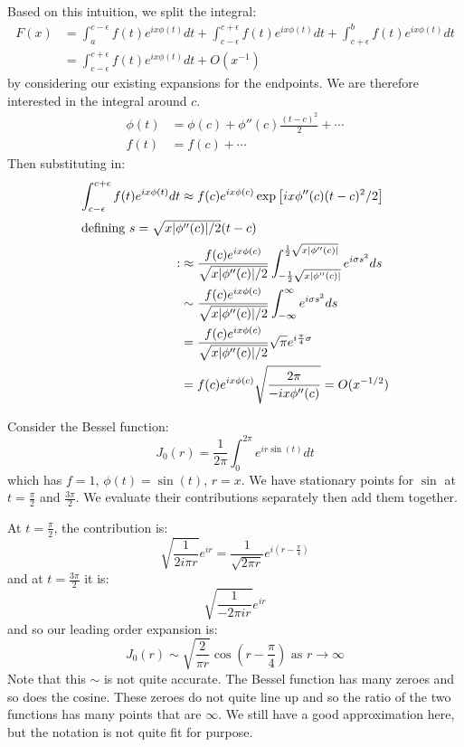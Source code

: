 \documentclass[../Main.tex]{subfiles}
\begin{document}
Based on this intuition, we split the integral:
\begin{align*}
    F(x) &= \int_{a}^{c-\epsilon} f(t)e^{ix\phi(t)} dt + \int_{c-\epsilon}^{c+\epsilon} f(t)e^{ix\phi(t)} dt + \int_{c+\epsilon}^{b} f(t)e^{ix\phi(t)} dt \\
    &= \int_{c-\epsilon}^{c+\epsilon} f(t)e^{ix\phi(t)} dt + O(x^{-1})
\end{align*}
by considering our existing expansions for the endpoints. We are therefore interested in the integral around $c$.
\begin{align*}
    \phi(t) &= \phi(c) + \phi''(c) \frac{(t-c)^2}{2} + \cdots \\
    f(t) &= f(c) + \cdots
\end{align*}
Then substituting in:
\begin{align*}
    \int_{c-\epsilon}^{c+\epsilon} f(t)e^{ix\phi(t)} dt &\approx f(c) e^{ix\phi(c)} \exp\left[ix\phi''(c) (t-c)^2 / 2\right] \\
    \intertext{defining $s = \sqrt{x|\phi''(c)| / 2}(t-c)$}:
    &\approx \frac{f(c)e^{ix\phi(c)}}{\sqrt{x|\phi''(c)| / 2}} \int_{-\frac12 \sqrt{x|\phi''(c)|}}^{\frac12 \sqrt{x|\phi''(c)|}} e^{i\sigma s^2} ds \\
    &\sim \frac{f(c)e^{ix\phi(c)}}{\sqrt{x|\phi''(c)| / 2}} \int_{-\infty}^{\infty} e^{i\sigma s^2} ds \\
    &= \frac{f(c)e^{ix\phi(c)}}{\sqrt{x|\phi''(c)| / 2}} \sqrt{\pi} e^{i \frac{\pi}{4} \sigma} \\
    &= f(c) e^{ix\phi(c)} \sqrt{\frac{2\pi}{-ix\phi''(c)}} = O(x^{-1/2})
\end{align*}
\begin{example}
    \label{exBesselStatPhase}
    Consider the Bessel function:
    \begin{equation*}
        J_0(r) = \frac{1}{2\pi} \int_{0}^{2\pi} e^{ir\sin(t)} dt 
    \end{equation*}
    which has $f = 1$, $\phi(t) = \sin(t)$, $r = x$. We have stationary points for $\sin$ at $t = \frac\pi2$ and $\frac{3\pi}2$. We evaluate their contributions separately then add them together.

    At $t = \frac\pi2$, the contribution is:
    \begin{equation*}
        \sqrt{\frac{1}{2i\pi r}} e^{ir} = \frac{1}{\sqrt{2\pi r}}e^{i(r - \frac\pi 4)}
    \end{equation*}
    and at $t = \frac{3\pi}{2}$ it is:
    \begin{equation*}
        \sqrt{\frac{1}{-2\pi i r}}e^{ir}
    \end{equation*}
    and so our leading order expansion is:
    \begin{equation*}
        J_0(r) \sim \sqrt{\frac{2}{\pi r}} \cos\left(r - \frac{\pi}{4}\right) \text{ as } r \to \infty
    \end{equation*}
    Note that this $\sim$ is not quite accurate. The Bessel function has many zeroes and so does the cosine. These zeroes do not quite line up and so the ratio of the two functions has many points that are $\infty$. We still have a good approximation here, but the notation is not quite fit for purpose.
\end{example}
\end{document}
